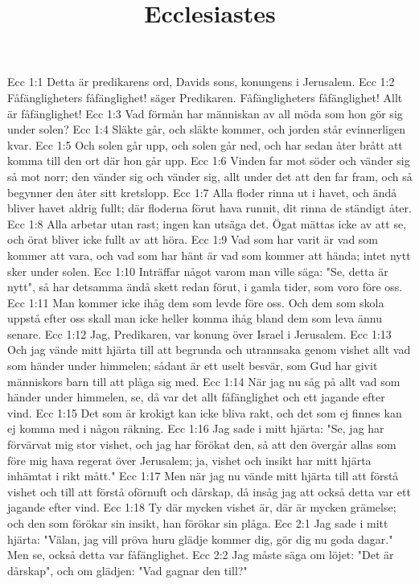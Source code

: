 

\title{Ecclesiastes}

Ecc 1:1  Detta är predikarens ord, Davids sons, konungens i Jerusalem.
Ecc 1:2  Fåfängligheters fåfänglighet! säger Predikaren. Fåfängligheters fåfänglighet! Allt är fåfänglighet!
Ecc 1:3  Vad förmån har människan av all möda som hon gör sig under solen?
Ecc 1:4  Släkte går, och släkte kommer, och jorden står evinnerligen kvar.
Ecc 1:5  Och solen går upp, och solen går ned, och har sedan åter brått att komma till den ort där hon går upp.
Ecc 1:6  Vinden far mot söder och vänder sig så mot norr; den vänder sig och vänder sig, allt under det att den far fram, och så begynner den åter sitt kretslopp.
Ecc 1:7  Alla floder rinna ut i havet, och ändå bliver havet aldrig fullt; där floderna förut hava runnit, dit rinna de ständigt åter.
Ecc 1:8  Alla arbetar utan rast; ingen kan utsäga det. Ögat mättas icke av att se, och örat bliver icke fullt av att höra.
Ecc 1:9  Vad som har varit är vad som kommer att vara, och vad som har hänt är vad som kommer att hända; intet nytt sker under solen.
Ecc 1:10  Inträffar något varom man ville säga: "Se, detta är nytt", så har detsamma ändå skett redan förut, i gamla tider, som voro före oss.
Ecc 1:11  Man kommer icke ihåg dem som levde före oss. Och dem som skola uppstå efter oss skall man icke heller komma ihåg bland dem som leva ännu senare.
Ecc 1:12  Jag, Predikaren, var konung över Israel i Jerusalem.
Ecc 1:13  Och jag vände mitt hjärta till att begrunda och utrannsaka genom vishet allt vad som händer under himmelen; sådant är ett uselt besvär, som Gud har givit människors barn till att plåga sig med.
Ecc 1:14  När jag nu såg på allt vad som händer under himmelen, se, då var det allt fåfänglighet och ett jagande efter vind.
Ecc 1:15  Det som är krokigt kan icke bliva rakt, och det som ej finnes kan ej komma med i någon räkning.
Ecc 1:16  Jag sade i mitt hjärta: "Se, jag har förvärvat mig stor vishet, och jag har förökat den, så att den övergår allas som före mig hava regerat över Jerusalem; ja, vishet och insikt har mitt hjärta inhämtat i rikt mått."
Ecc 1:17  Men när jag nu vände mitt hjärta till att förstå vishet och till att förstå oförnuft och dårskap, då insåg jag att också detta var ett jagande efter vind.
Ecc 1:18  Ty där mycken vishet är, där är mycken grämelse; och den som förökar sin insikt, han förökar sin plåga.
Ecc 2:1  Jag sade i mitt hjärta: "Välan, jag vill pröva huru glädje kommer dig, gör dig nu goda dagar." Men se, också detta var fåfänglighet.
Ecc 2:2  Jag måste säga om löjet: "Det är dårskap", och om glädjen: "Vad gagnar den till?"

